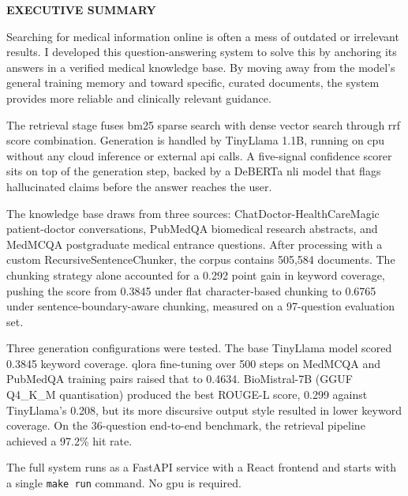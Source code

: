 \begin{center}
	\Large{\textbf{EXECUTIVE SUMMARY}}
\end{center}
\vspace{1em}
\normalsize

Searching for medical information online is often a mess of outdated or irrelevant results. I developed this question-answering system to solve this by anchoring its answers in a verified medical knowledge base. By moving away from the model's general training memory and toward specific, curated documents, the system provides more reliable and clinically relevant guidance.

The retrieval stage fuses \ac{bm25} sparse search with dense vector search through \ac{rrf} score combination. Generation is handled by TinyLlama 1.1B, running on \ac{cpu} without any cloud inference or external \ac{api} calls. A five-signal confidence scorer sits on top of the generation step, backed by a DeBERTa \ac{nli} model that flags hallucinated claims before the answer reaches the user.

The knowledge base draws from three sources: ChatDoctor-HealthCareMagic patient-doctor conversations, PubMedQA biomedical research abstracts, and MedMCQA postgraduate medical entrance questions. After processing with a custom RecursiveSentenceChunker, the corpus contains 505,584 documents. The chunking strategy alone accounted for a 0.292 point gain in keyword coverage, pushing the score from 0.3845 under flat character-based chunking to 0.6765 under sentence-boundary-aware chunking, measured on a 97-question evaluation set.

Three generation configurations were tested. The base TinyLlama model scored 0.3845 keyword coverage. \ac{qlora} fine-tuning over 500 steps on MedMCQA and PubMedQA training pairs raised that to 0.4634. BioMistral-7B (GGUF Q4\_K\_M\allowbreak{} quantisation) produced the best ROUGE-L score, 0.299 against TinyLlama's 0.208, but its more discursive output style resulted in lower keyword coverage. On the 36-question end-to-end benchmark, the retrieval pipeline achieved a 97.2\% hit rate.

The full system runs as a FastAPI service with a React frontend and starts with a single \texttt{make\allowbreak{} run} command. No \ac{gpu} is required.
